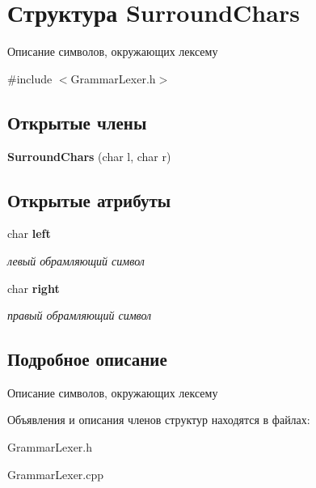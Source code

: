 \section{Структура \-Surround\-Chars}
\label{structSurroundChars}


Описание символов, окружающих лексему  




{\ttfamily \#include $<$\-Grammar\-Lexer.\-h$>$}

\subsection*{Открытые члены}
\begin{DoxyCompactItemize}
\item 
{\bfseries \-Surround\-Chars} (char l, char r)\label{structSurroundChars_abc9876360349909ea958da1097635dc8}

\end{DoxyCompactItemize}
\subsection*{Открытые атрибуты}
\begin{DoxyCompactItemize}
\item 
char {\bf left}\label{structSurroundChars_a01aab228ec4e8d8d1d34215e9b817bb2}

\begin{DoxyCompactList}\small\item\em левый обрамляющий символ \end{DoxyCompactList}\item 
char {\bf right}\label{structSurroundChars_a18d7820ae790961c0e17b130571b4c38}

\begin{DoxyCompactList}\small\item\em правый обрамляющий символ \end{DoxyCompactList}\end{DoxyCompactItemize}


\subsection{Подробное описание}
Описание символов, окружающих лексему 

Объявления и описания членов структур находятся в файлах\-:\begin{DoxyCompactItemize}
\item 
\-Grammar\-Lexer.\-h\item 
\-Grammar\-Lexer.\-cpp\end{DoxyCompactItemize}
